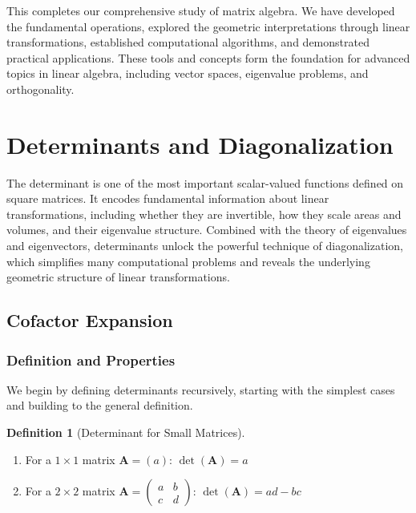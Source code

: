 \documentclass[12pt]{article}
\numberwithin{equation}{section}
\newcommand{\mat}[1]{\mathbf{#1}}        %
\theoremstyle{plain}
\theoremstyle{definition}
\newtheorem{definition}[theorem]{Definition}
\theoremstyle{remark}
\begin{document}
This completes our comprehensive study of matrix algebra. We have developed the fundamental operations, explored the geometric interpretations through linear transformations, established computational algorithms, and demonstrated practical applications. These tools and concepts form the foundation for advanced topics in linear algebra, including vector spaces, eigenvalue problems, and orthogonality.

\newpage
\section{Determinants and Diagonalization}

The determinant is one of the most important scalar-valued functions defined on square matrices. It encodes fundamental information about linear transformations, including whether they are invertible, how they scale areas and volumes, and their eigenvalue structure. Combined with the theory of eigenvalues and eigenvectors, determinants unlock the powerful technique of diagonalization, which simplifies many computational problems and reveals the underlying geometric structure of linear transformations.

\subsection{Cofactor Expansion}

\subsubsection{Definition and Properties}

We begin by defining determinants recursively, starting with the simplest cases and building to the general definition.

\begin{definition}[Determinant for Small Matrices]
\begin{enumerate}
\item For a $1 \times 1$ matrix $\mat{A} = (a)$: $\det(\mat{A}) = a$
\item For a $2 \times 2$ matrix $\mat{A} = \begin{pmatrix} a & b \\ c & d \end{pmatrix}$: $\det(\mat{A}) = ad - bc$
\end{enumerate}
\end{definition}
\end{document}
